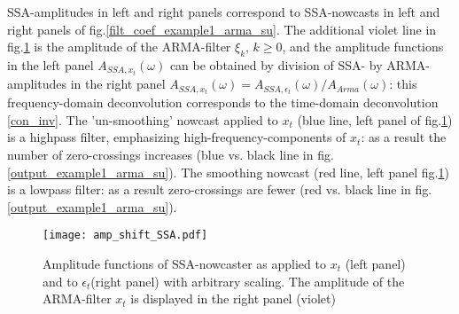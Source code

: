 \documentclass[a4paper]{article}
\begin{document}
SSA-amplitudes in left and right  panels correspond to SSA-nowcasts in left and right panels of fig.\ref{filt_coef_example1_arma_su}. The additional violet line in fig.\ref{amp_shift_SSA} is the amplitude of the ARMA-filter $\xi_k$, $k\geq 0$, and the amplitude functions in the left panel $A_{SSA,x_t}(\omega)$ can be obtained by  division of SSA- by ARMA-amplitudes in the right panel $A_{SSA,x_t}(\omega)=A_{SSA,\epsilon_t}(\omega)/A_{Arma}(\omega)$: this frequency-domain deconvolution corresponds to the time-domain deconvolution \ref{con_inv}.  The 'un-smoothing' nowcast applied to $x_t$ (blue line, left panel of fig.\ref{amp_shift_SSA}) is a highpass filter,  emphasizing high-frequency-components of $x_t$: as a result the number of zero-crossings increases (blue vs. black line in fig.\ref{output_example1_arma_su}). The smoothing nowcast (red line, left panel fig.\ref{amp_shift_SSA}) is a lowpass filter: as a result zero-crossings are fewer (red vs. black line in fig.\ref{output_example1_arma_su}). %
\begin{figure}[H]\begin{center}\texttt{[image: amp\_shift\_SSA.pdf]}\caption{Amplitude functions of SSA-nowcaster as applied to $x_t$  (left panel) and to $\epsilon_t$(right panel) with arbitrary scaling. The amplitude of the ARMA-filter $x_t$ is displayed in the right panel (violet)\label{amp_shift_SSA}}\end{center}\end{figure}%
\end{document}
